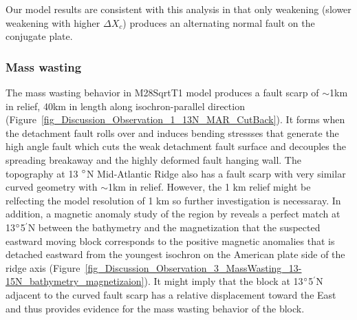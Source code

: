 Our model results are consistent with this analysis in that only weakening (slower weakening with higher $\Delta X_{c}$) produces an alternating normal fault on the conjugate plate.


\subsubsection{Mass wasting}

The mass wasting behavior in M28SqrtT1 model produces a fault scarp of $\sim$1km in relief, 40km in length along isochron-parallel direction (Figure~\hyperref[fig_Discussion_Observation_1_13N_MAR_CutBack]{\ref{fig_Discussion_Observation_1_13N_MAR_CutBack}}). It forms when the detachment fault rolls over and induces bending stressses that generate the high angle fault which cuts the weak detachment fault surface and decouples the spreading breakaway and the highly deformed fault hanging wall. The topography at 13 $\degree$N Mid-Atlantic Ridge also has a fault scarp with very similar curved geometry with $\sim$1km in relief. However, the 1 km relief might be relfecting the model resolution of 1 km so further investigation is necessaray. In addition, a magnetic anomaly study of the region by \citep{Smith2008} reveals a perfect match at 13$\degree$5$^{\prime}$N between the bathymetry and the magnetization that the suspected eastward moving block corresponds to the positive magnetic anomalies that is detached eastward from the youngest isochron on the American plate side of the ridge axis (Figure~\hyperref[fig_Discussion_Observation_3_MassWasting_13-15N_bathymetry_magnetizaion]{\ref{fig_Discussion_Observation_3_MassWasting_13-15N_bathymetry_magnetizaion}}). It might imply that the block at 13$\degree$5$^{\prime}$N adjacent to the curved fault scarp has a relative displacement toward the East and thus provides evidence for the mass wasting behavior of the block.   

